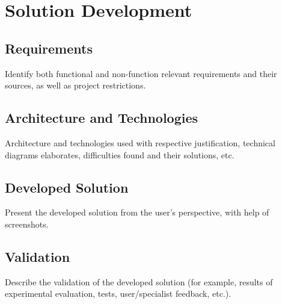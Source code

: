 \section{Solution Development}
\label{section:development}

\subsection{Requirements}

Identify both functional and non-function relevant requirements and their sources, as well as project restrictions.

\subsection{Architecture and Technologies}

Architecture and technologies used with respective justification, technical diagrams elaborates, difficulties found and their solutions, etc.

\subsection{Developed Solution} 

Present the developed solution from the user's perspective, with help of screenshots.

\subsection{Validation}

Describe the validation of the developed solution (for example, results of experimental evaluation, tests, user/specialist feedback, etc.).